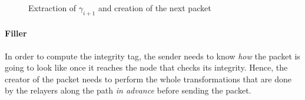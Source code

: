 \begin{figure}[H]
    \caption{Extraction of $\gamma_{i+1}$ and creation of the next packet}
\end{figure}

\paragraph{Filler}

In order to compute the integrity tag, the sender needs to know \textit{how} the packet is going to look like once it reaches the node that checks its integrity. Hence, the creator of the packet needs to perform the whole transformations that are done by the relayers along the path \textit{in advance} before sending the packet.

